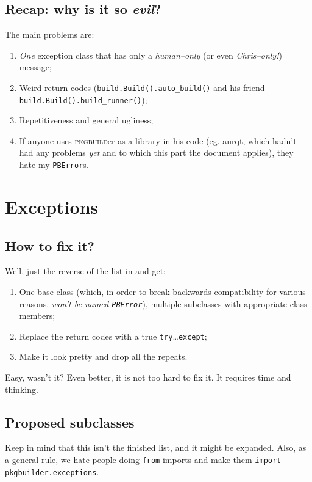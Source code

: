 \documentclass[a4paper,english]{book}
\numberwithin{equation}{section}
\newcommand{\pb}[0]{\textsc{pkgbuild}er}
\newcommand{\p}[1]{\nohyphens{\texttt{#1}}}
\begin{document}
\pagebreak
\section{Recap: why is it so \emph{evil}?}\label{sec:e:1:recap}
\osn The main problems are:

\begin{enumerate}
\item \emph{One} exception class that has only a \emph{human–only} (or even \emph{Chris–only!}) message;
\item Weird return codes (\p{build.Build().auto\_build()} and his friend \p{build.Build().build\_runner()});
\item Repetitiveness and general ugliness;
\item If anyone uses \pb{} as a library in his code (eg. aurqt, which hadn’t had any problems \emph{yet} and to which this part the document applies), they hate my \p{PBError}s. \rm
\end{enumerate}

\chapter{Exceptions  \rm}


\section{How to fix it?}

\rm Well, just the reverse of the list in  and get: \osn

\begin{enumerate}
\item One base class (which, in order to break backwards compatibility for various reasons, \emph{won’t be named \p{PBError}}), multiple subclasses with appropriate class members;
\item Replace the return codes with a true \p{try}…\p{except};
\item Make it look pretty and drop all the repeats.
\end{enumerate}

\rm Easy, wasn’t it?  Even better, it is not too hard to fix it.  It requires time and thinking.

\section{Proposed subclasses}

\osn Keep in mind that this isn’t the finished list, and it might be expanded.  Also, as a general rule, we hate people doing \p{from} imports and make them \p{import pkgbuilder.exceptions}.
\end{document}
